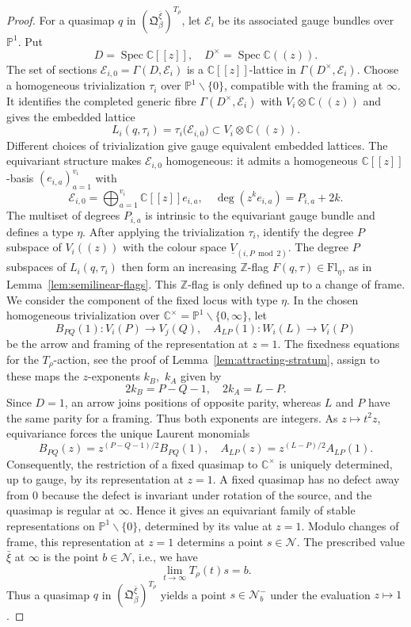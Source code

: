 \documentclass[11pt,reqno]{amsart}
\theoremstyle{definition}
\theoremstyle{remark}
\def\bbZ{\mathbb Z}
\def\dV{\underline V}
\def\calN{\mathcal N}
\def\Fl{\mathrm{Fl}}
\newcommand{\llb}{[\![}
\newcommand{\rrb}{]\!]}
\newcommand{\llp}{(\!(}
\newcommand{\rrp}{)\!)}
\begin{document}
\begin{proof}
For a quasimap $q$ in $(\mathfrak Q_\beta^{\bar\xi})^{T_\rho}$, let $\mathcal E_i$ be its associated
gauge bundles over $\mathbb P^1$.
Put 
$$D=\operatorname{Spec}\mathbb C\llb z\rrb
,\quad
D^\times=\operatorname{Spec}\mathbb C\llp z\rrp.$$
The set of sections
$\mathcal E_{i,0}=\Gamma(D,\mathcal E_i)$
is a $\mathbb C\llb z\rrb$-lattice in
$\Gamma(D^\times,\mathcal E_i)$.
Choose a homogeneous trivialization $\tau_i$ over
$\mathbb P^1\smallsetminus\{0\}$, compatible with the framing at $\infty$.
It identifies the completed generic fibre $\Gamma(D^\times,\mathcal E_i)$ with
$V_i\otimes\mathbb C\llp z\rrp$ and gives the embedded lattice
\[
 L_i(q,\tau_i)=\tau_i\bigl({\mathcal E}_{i,0}\bigr)
 \subset V_i\otimes\mathbb C\llp z\rrp.
\]
Different choices of trivialization give gauge equivalent embedded lattices. 
The equivariant structure makes
${\mathcal E}_{i,0}$ homogeneous: it admits a homogeneous
$\mathbb C\llb z\rrb$-basis $(e_{i,a})_{a=1}^{v_i}$ with
\[
 {\mathcal E}_{i,0}
 =\bigoplus_{a=1}^{v_i}\mathbb C\llb z\rrb e_{i,a},
 \quad \deg(z^ke_{i,a})=P_{i,a}+2k.
\]
The multiset of degrees $P_{i,a}$ is intrinsic to the equivariant
gauge bundle and defines a type $\eta$.
After applying the trivialization $\tau_i$, identify the degree $P$
subspace of $V_i\llp z\rrp$ with the colour space
$\dV_{(i,P\bmod 2)}$. The degree $P$ subspaces of
$L_i(q,\tau_i)$ then form an increasing $\bbZ$-flag
$F(q,\tau)\in\Fl_\eta$, as in Lemma~\ref{lem:semilinear-flags}.
This $\mathbb Z$-flag is only defined up to a change of frame.
We consider the component of the fixed locus with type $\eta$.
In the chosen homogeneous trivialization over
$\mathbb C^\times=\mathbb P^1\smallsetminus\{0,\infty\}$, let
$$B_{PQ}(1):V_i(P)\to V_j(Q)
,\quad
A_{LP}(1):W_i(L)\to V_i(P)$$ 
be the arrow and framing of the representation at $z=1$.
The fixedness equations for the  $T_\rho$-action,
see the proof of Lemma~\ref{lem:attracting-stratum},
assign to these maps the $z$-exponents $k_B,$ $k_A$ given by
\[
 2k_B=P-Q-1,\quad 2k_A=L-P.
\]
Since $D=1$, an arrow joins positions of opposite parity, whereas
$L$ and $P$ have the same parity for a framing.  Thus both exponents
are integers.  As $z\mapsto t^2z$, equivariance forces the unique
Laurent monomials
\[
 B_{PQ}(z)=z^{(P-Q-1)/2}B_{PQ}(1),\quad
 A_{LP}(z)=z^{(L-P)/2}A_{LP}(1).
\]
Consequently, the restriction of a fixed quasimap to
$\mathbb C^\times$ is uniquely determined, up to gauge, by its representation at $z=1$.
A fixed quasimap has no defect away from $0$ because the defect is invariant
under rotation of the source, and the quasimap is regular at $\infty$.
Hence it gives an equivariant family of stable representations on
$\mathbb P^1\smallsetminus\{0\}$, determined by its value at $z=1$. 
Modulo changes of frame, this representation at $z=1$ determins a point $s\in\calN$.
The prescribed value $\bar\xi$ at $\infty$ is the point $b\in\calN$, i.e., we have 
$$\lim_{t\to\infty}T_\rho(t)s=b.$$ 
Thus a quasimap $q$ in $(\mathfrak Q_\beta^{\bar\xi})^{T_\rho}$ yields a point $s\in \calN_b^-$ under the evaluation $z\mapsto 1$.


\end{proof}
\end{document}
